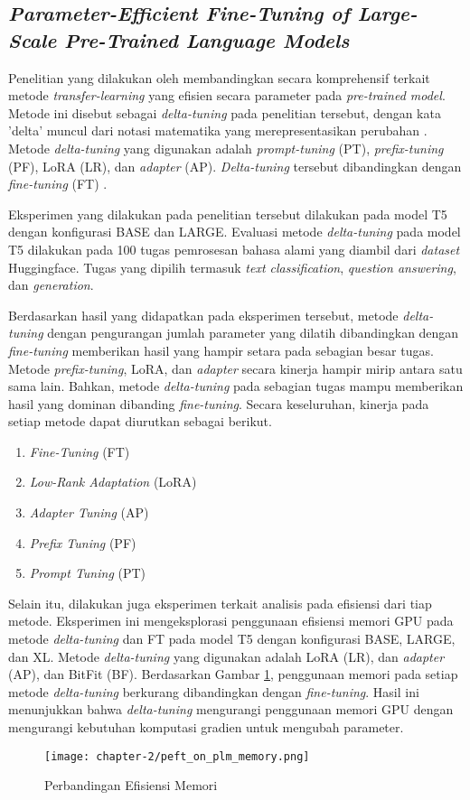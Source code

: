 \subsection{\textit{Parameter-Efficient Fine-Tuning of Large-Scale
Pre-Trained Language Models}}

Penelitian yang dilakukan oleh \citeauthor{peft_on_plm} membandingkan secara komprehensif terkait metode \textit{transfer-learning} yang efisien secara parameter pada \textit{pre-trained model}. Metode ini disebut sebagai \textit{delta-tuning} pada penelitian tersebut, dengan kata 'delta' muncul dari notasi matematika yang merepresentasikan perubahan \parencite{peft_on_plm}. Metode \textit{delta-tuning} yang digunakan adalah \textit{prompt-tuning} (PT), \textit{prefix-tuning} (PF), LoRA (LR), dan \textit{adapter} (AP). \textit{Delta-tuning} tersebut  dibandingkan dengan \textit{fine-tuning} (FT) .

Eksperimen yang dilakukan pada penelitian tersebut dilakukan pada model T5 dengan konfigurasi BASE dan LARGE. Evaluasi metode \textit{delta-tuning} pada model T5 dilakukan pada 100 tugas pemrosesan bahasa alami yang diambil dari \textit{dataset} Huggingface. Tugas yang dipilih termasuk \textit{text classification}, \textit{question answering}, dan \textit{generation}.

Berdasarkan hasil yang didapatkan pada eksperimen tersebut, metode \textit{delta-tuning} dengan pengurangan jumlah parameter yang dilatih dibandingkan dengan \textit{fine-tuning} memberikan hasil yang hampir setara pada sebagian besar tugas. Metode \textit{prefix-tuning}, LoRA, dan \textit{adapter} secara kinerja hampir mirip antara satu sama lain. Bahkan, metode \textit{delta-tuning} pada sebagian tugas mampu memberikan hasil yang dominan dibanding \textit{fine-tuning}. Secara keseluruhan, kinerja pada setiap metode dapat diurutkan sebagai berikut.

\begin{enumerate}
    \item \textit{Fine-Tuning} (FT)
    \item \textit{Low-Rank Adaptation} (LoRA)
    \item \textit{Adapter Tuning} (AP)
    \item \textit{Prefix Tuning} (PF)
    \item \textit{Prompt Tuning} (PT)
\end{enumerate}

Selain itu, dilakukan juga eksperimen terkait analisis pada efisiensi dari tiap metode. Eksperimen ini mengeksplorasi penggunaan efisiensi memori GPU pada metode \textit{delta-tuning} dan FT pada model T5 dengan konfigurasi BASE, LARGE, dan XL. Metode \textit{delta-tuning} yang digunakan adalah LoRA (LR), dan \textit{adapter} (AP), dan BitFit (BF). Berdasarkan Gambar \ref{fig:peft_on_plm_memory}, penggunaan memori pada setiap metode \textit{delta-tuning} berkurang dibandingkan dengan \textit{fine-tuning}. Hasil ini menunjukkan bahwa \textit{delta-tuning} mengurangi penggunaan memori GPU dengan mengurangi kebutuhan komputasi gradien untuk mengubah parameter.

\begin{figure}[ht]
    \centering
    \texttt{[image: chapter-2/peft\_on\_plm\_memory.png]}
    \caption{Perbandingan Efisiensi Memori \parencite{peft_on_plm}}
    \label{fig:peft_on_plm_memory}
\end{figure}

